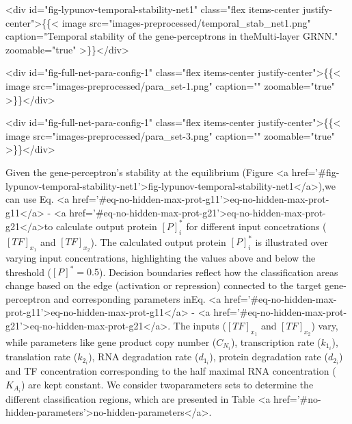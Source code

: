 \documentclass[twocolumn]{biophys-new}
\begin{document}
{{<div id="fig-lypunov-temporal-stability-net1" class="flex items-center justify-center">\{\{< image src="images-preprocessed/temporal_stab_net1.png" caption="Temporal stability of the gene-perceptrons in theMulti-layer GRNN.\vspace{-0.5em}" zoomable="true" >\}\}</div>



<div id="fig-full-net-para-config-1" class="flex items-center justify-center">\{\{< image src="images-preprocessed/para_set-1.png" caption="" zoomable="true" >\}\}</div>


<div id="fig-full-net-para-config-1" class="flex items-center justify-center">\{\{< image src="images-preprocessed/para_set-3.png" caption="" zoomable="true" >\}\}</div>



Given the gene-perceptron's stability at the equilibrium (Figure <a href='#fig-lypunov-temporal-stability-net1'>fig-lypunov-temporal-stability-net1</a>),we can use Eq. <a href='#eq-no-hidden-max-prot-g11'>eq-no-hidden-max-prot-g11</a> - <a href='#eq-no-hidden-max-prot-g21'>eq-no-hidden-max-prot-g21</a>to calculate output protein $[P]_i^*$ for different input concetrations ($[TF]_{x_1}$ and $[TF]_{x_2}$). The calculated output protein $[P]_i^*$ is illustrated over varying input concentrations, highlighting the values above and below the threshold ($[P]^*=0.5$).
Decision boundaries reflect how the classification areas change based on the edge (activation or repression) connected to the target gene-perceptron and corresponding parameters inEq. <a href='#eq-no-hidden-max-prot-g11'>eq-no-hidden-max-prot-g11</a> - <a href='#eq-no-hidden-max-prot-g21'>eq-no-hidden-max-prot-g21</a>. 
The inputs ($[TF]_{x_1}$ and $[TF]_{x_2}$) vary, while parameters like gene product copy number ($C_{N_i}$), transcription rate ($k_{1_i}$), translation rate ($k_{2_i}$), RNA degradation rate ($d_{1_i}$), protein degradation rate ($d_{2_i}$) and TF concentration corresponding to the half maximal RNA concentration ($K_{A_i}$) are kept constant. 
We consider twoparameters sets to determine the different classification regions, which are presented in Table <a href='#no-hidden-parameters'>no-hidden-parameters</a>.




}}
\end{document}
